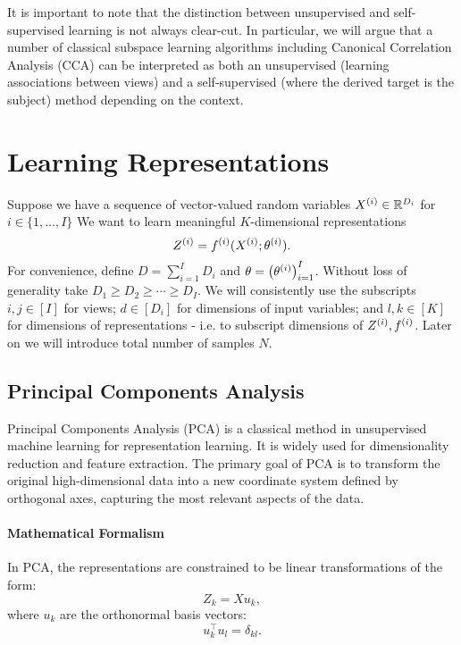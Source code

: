 It is important to note that the distinction between unsupervised and self-supervised learning is not always clear-cut.
In particular, we will argue that a number of classical subspace learning algorithms including Canonical Correlation
Analysis (CCA) can be interpreted as both an unsupervised (learning associations between views) and a self-supervised (where the derived target is the subject) method depending on the context.

\section{Learning Representations}

Suppose we have a sequence of vector-valued random variables $X^{(i)} \in \mathbb{R}^{D_i}$ for $i \in \{1, \dots, I \}$
We want to learn meaningful $K$-dimensional representations
\begin{equation}\label{eq:general-form-of-representations}
    Z^{(i)} = f^{(i)}( X^{(i)}; \theta^{(i)}).
\end{equation}
For convenience, define $D = \sum_{i=1}^I D_i$ and $\theta = \left(\theta^{(i)}\right)_{i=1}^I$.
Without loss of generality take $D_1 \geq D_2 \geq \cdots \geq D_I$.
We will consistently use the subscripts $i,j \in [I]$ for views;
$d \in [D_i]$ for dimensions of input variables;
and $l,k \in [K]$ for dimensions of representations - i.e. to subscript dimensions of $Z^{(i)}, f^{(i)}$.
Later on we will introduce total number of samples $N$.

\subsection{Principal Components Analysis}

Principal Components Analysis (PCA)\cite{hotelling1933analysis} is a classical method in unsupervised machine learning for representation learning.
It is widely used for dimensionality reduction and feature extraction.
The primary goal of PCA is to transform the original high-dimensional data into a new coordinate system defined by orthogonal axes, capturing the most relevant aspects of the data.

\paragraph{Mathematical Formalism} In PCA, the representations are constrained to be linear transformations of the form:
\begin{equation}\label{eq:pca-linear-function-def}
    Z_k = X u_k,
\end{equation}
where $u_k$ are the orthonormal basis vectors:
\begin{equation}\label{eq:pca-orthonormality-constraint}
    u_k^\top u_l = \delta_{kl}.
\end{equation}


